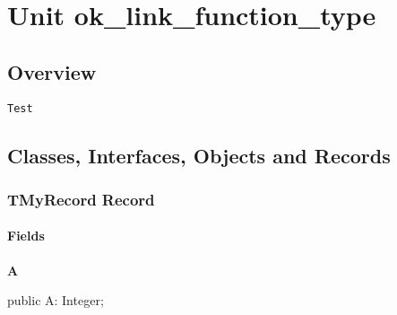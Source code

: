 \documentclass{report}
\newif\ifpdf
\begin{document}
\label{toc}\tableofcontents
\newpage
\newlength{\tmplength}
\chapter{Unit ok{\_}link{\_}function{\_}type}
\label{ok_link_function_type}
\section{Overview}
\begin{description}
\item[\texttt{\begin{ttfamily}TMyRecord\end{ttfamily} Record}]
\end{description}
\begin{description}
\item[\texttt{Test}]
\end{description}
\section{Classes, Interfaces, Objects and Records}
\ifpdf
\subsection*{\large{\textbf{TMyRecord Record}}\normalsize\hspace{1ex}\hrulefill}
\else
\subsection*{TMyRecord Record}
\fi
\label{ok_link_function_type.TMyRecord}
\subsubsection*{\large{\textbf{Fields}}\normalsize\hspace{1ex}\hfill}
\begin{list}{}{
\setlength{\itemindent}{0cm}
\setlength{\listparindent}{0cm}
\setlength{\leftmargin}{\evensidemargin}
\addtolength{\leftmargin}{\tmplength}
\settowidth{\labelsep}{X}
\addtolength{\leftmargin}{\labelsep}
\setlength{\labelwidth}{\tmplength}
}
\label{ok_link_function_type.TMyRecord-A}
\item[\textbf{A}\hfill]
\ifpdf
\begin{flushleft}
\fi
\begin{ttfamily}
public A: Integer;\end{ttfamily}

\ifpdf
\end{flushleft}
\fi


\par  \end{list}
\end{document}

